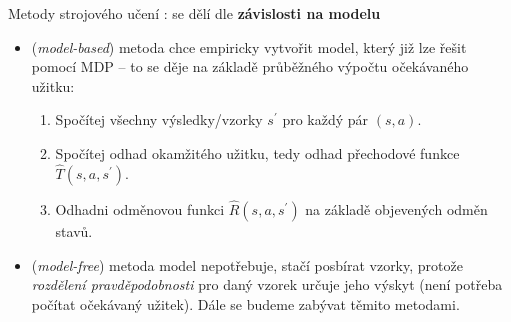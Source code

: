 Metody strojového učení \cite{RLIntro}: se dělí dle \textbf{závislosti na modelu}
\begin{itemize}
\item (\textit{model-based}) metoda chce empiricky vytvořit model, který již lze řešit pomocí MDP -- to se děje na základě průběžného výpočtu očekávaného užitku: 
\begin{enumerate}
\item Spočítej všechny výsledky/vzorky $s^\prime$ pro každý pár $(s,a)$.
\item Spočítej odhad okamžitého užitku, tedy odhad přechodové funkce $\hat{T}(s,a,s^\prime)$.
\item Odhadni odměnovou funkci $\hat{R}(s,a,s^\prime)$ na základě objevených odměn stavů.
\end{enumerate}
\item (\textit{model-free}) metoda model nepotřebuje, stačí posbírat vzorky, protože \textit{rozdělení pravděpodobnosti} pro daný vzorek určuje jeho výskyt (není potřeba počítat očekávaný užitek). Dále se budeme zabývat těmito metodami.
\end{itemize}

